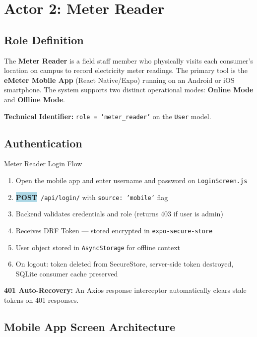 \documentclass[12pt, a4paper]{report}
\newcommand{\httppost}{\colorbox{lightBlue}{\textcolor{deepBlue}{\textbf{\small POST}}}}
\begin{document}
\chapter{Actor 2: Meter Reader}

\section{Role Definition}

The \textbf{Meter Reader} is a field staff member who physically visits each consumer's location on campus to record electricity meter readings. The primary tool is the \textbf{eMeter Mobile App} (React Native/Expo) running on an Android or iOS smartphone. The system supports two distinct operational modes: \textbf{Online Mode} and \textbf{Offline Mode}.

\textbf{Technical Identifier:} \texttt{role = 'meter\_reader'} on the \texttt{User} model.

\section{Authentication}

\begin{actorbox}{Meter Reader Login Flow}
\begin{enumerate}[leftmargin=1.5em]
    \item Open the mobile app and enter username and password on \texttt{LoginScreen.js}
    \item \httppost\ \texttt{/api/login/} with \texttt{source: 'mobile'} flag
    \item Backend validates credentials and role (returns 403 if user is admin)
    \item Receives DRF Token — stored encrypted in \texttt{expo-secure-store}
    \item User object stored in \texttt{AsyncStorage} for offline context
    \item On logout: token deleted from SecureStore, server-side token destroyed, SQLite consumer cache preserved
\end{enumerate}
\end{actorbox}

\textbf{401 Auto-Recovery:} An Axios response interceptor automatically clears stale tokens on 401 responses.

\section{Mobile App Screen Architecture}
\end{document}
